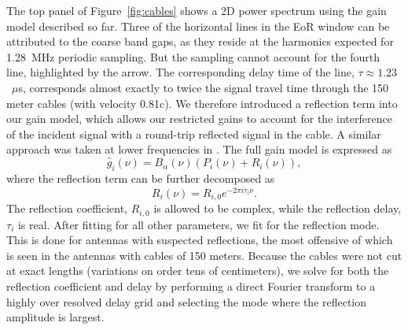 \documentclass[iop]{emulateapj}
\begin{document}
The top panel of Figure~\ref{fig:cables} shows a 2D power spectrum using the gain model 
described so far. Three of the horizontal lines in the EoR window can be attributed to the 
coarse band gaps, as they reside at the harmonics expected for 1.28~MHz periodic 
sampling. But the sampling cannot account for the fourth line, highlighted by the arrow. The 
corresponding delay time of the line, $\tau \approx 1.23$~$\mu$s, corresponds almost 
exactly to twice the signal travel time through the 150 meter cables (with velocity 0.81c). We 
therefore introduced a reflection term into our gain model, which allows our restricted gains 
to account for the interference of the incident signal with a round-trip reflected signal in the 
cable. 
A similar approach was taken at lower frequencies in \citealt{Ewall-Wice:2016}.
The full gain model is expressed as
\begin{equation}\label{eq:cal2}
\hat{g}_i(\nu)=B_{\alpha}(\nu)\left(P_i(\nu)+R_i(\nu)\right),
\end{equation}
where the reflection term can be further decomposed as
\begin{equation}
R_i(\nu) = R_{i,0} e^{-2\pi i \tau_{i} \nu}.
\end{equation}
The reflection coefficient, $R_{i,0}$ is allowed to be complex, while the reflection delay, 
$\tau_i$ is real. After fitting for all other parameters, we fit for the reflection mode. This is 
done for antennas with suspected reflections, the most offensive of which is seen in the 
antennas with cables of 150 meters. Because the cables were not cut at exact lengths 
(variations on order tens of centimeters), we solve for both the reflection coefficient and 
delay by performing a direct Fourier transform to a highly over resolved delay grid and 
selecting the mode where the reflection amplitude is largest. 
\end{document}
